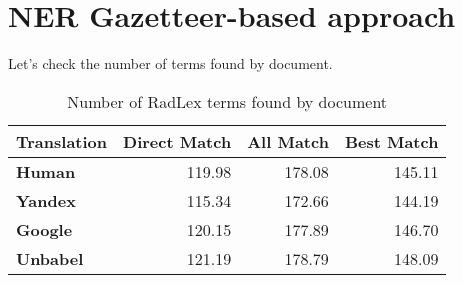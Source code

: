 \label{chap4}







\section{NER Gazetteer-based approach}

Let's check the number of terms found by document.


\begin{table}[ht]
\centering
\begin{tabular}{lrrr}
\toprule
\textbf{Translation}   &   \textbf{Direct Match} &   \textbf{All Match} &   \textbf{Best Match} \\
\midrule
 \textbf{Human}         &         119.98 &      178.08 &       145.11 \\
 
 \textbf{Yandex}        &         115.34 &      172.66 &       144.19 \\
 
 \textbf{Google}        &         120.15 &      177.89 &       146.70 \\
 
 \textbf{Unbabel}       &         121.19 &      178.79 &       148.09 \\
 
\bottomrule
\end{tabular} 
\caption{Number of RadLex terms found by document}
\label{table:terms_by_document}
\end{table}






